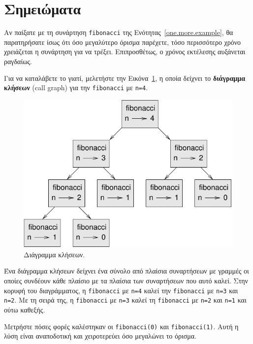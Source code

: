 \documentclass[10pt]{book}
\begin{document}
 
\section{Σημειώματα}

Αν παίξατε με τη συνάρτηση {\tt fibonacci} της Ενότητας~\ref{one.more.example},  θα παρατηρήσατε ίσως ότι όσο μεγαλύτερο όρισμα παρέχετε, τόσο περισσότερο χρόνο χρειάζεται η συνάρτηση για να τρέξει. Επιπροσθέτως, ο χρόνος εκτέλεσης αυξάνεται ραγδαίως.

Για να καταλάβετε το γιατί, μελετήστε την Εικόνα~\ref{fig.fibonacci}, η οποία δείχνει το {\bf διάγραμμα κλήσεων} (call graph) για την {\tt fibonacci} με {\tt n=4}.

\begin{figure}
\centerline
{\includegraphics[scale=0.7]{figs/fibonacci.pdf}}
 \caption{Διάγραμμα κλήσεων.} 
\label{fig.fibonacci}
\end{figure}

Ένα διάγραμμα κλήσεων δείχνει ένα σύνολο από πλαίσια συναρτήσεων με γραμμές οι οποίες συνδέουν κάθε πλαίσιο με τα πλαίσια των συναρτήσεων που αυτό καλεί. Στην κορυφή του διαγράμματος, η {\tt fibonacci} με {\tt n=4} καλεί την {\tt fibonacci} με {\tt n=3} και {\tt n=2}. Με τη σειρά της, η {\tt fibonacci} με  {\tt n=3} καλεί τη {\tt fibonacci} με {\tt n=2} και {\tt n=1} και ούτω καθεξής.

Μετρήστε πόσες φορές καλέστηκαν οι {\tt fibonacci(0)} και {\tt fibonacci(1)}.  Αυτή η λύση είναι αναποδοτική και χειροτερεύει όσο μεγαλώνει το όρισμα.
\end{document}
